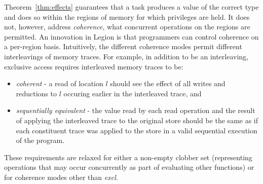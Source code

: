 Theorem~\ref{thm:effects} guarantees that a task produces a value of the
correct type and does so within the regions of memory for which privileges are held.
It does not, however, address {\em coherence}, what concurrent operations on the regions are permitted.
An innovation in Legion is that programmers can control coherence on a per-region basis.  Intuitively,
the different coherence modes permit different interleavings of memory traces.  For example,
in addition to be an interleaving, exclusive access requires interleaved memory traces to be:
\begin{itemize}
\item {\em coherent} - a read of location $l$ should see the effect of all writes and reductions to $l$
occuring earlier in the interleaved trace, and
\item {\em sequentially equivalent} - the value read by each read 
operation and the result of applying the interleaved trace to the original store should be the same as if each constituent trace
was applied to the store in a valid sequential execution of the program.
\end{itemize}
These requirements are relaxed for either a non-empty clobber set (representing
operations that may occur concurrently as part of evaluating other functions) or for coherence
modes other than {\em excl}.

